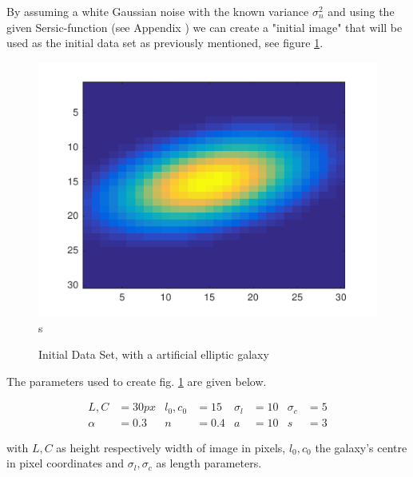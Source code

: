 By assuming a white Gaussian noise with the known variance $\sigma_n^2$ and using the given Sersic-function (see Appendix ) we can create a "initial image" that will be used as the initial data set as previously mentioned, see figure \ref{img:initial}.
\begin{figure}[!h]
	\centering
	\includegraphics{images/galaxy_initial}s
	\label{img:initial}
	\caption{Initial Data Set, with a artificial elliptic galaxy}
\end{figure}

The parameters used to create fig. \ref{img:initial} are given below.


	\begin{align*}
		L, C & = 30px & l_0, c_0 & = 15 & \sigma_l & = 10 & \sigma_c & = 5 \\
		\alpha & = 0.3 & n & = 0.4 & a & = 10 & s & = 3 
	\end{align*}

with $L,C$ as height respectively width of image in pixels, $l_0, c_0$ the galaxy's centre in pixel coordinates and $\sigma_l, \sigma_c$ as length parameters.


